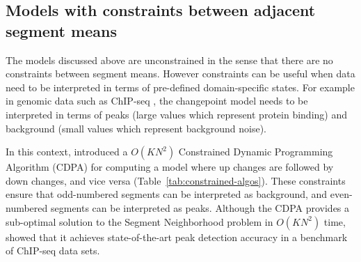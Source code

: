 \documentclass[article]{jss}
\begin{document}

\subsection{Models with constraints between adjacent segment means}


The models discussed above are unconstrained in the sense that there
are no constraints between segment means. However constraints can be
useful when data need to be interpreted in terms of pre-defined
domain-specific states. For example in genomic data such as ChIP-seq
\citep{chip-seq}, the changepoint model needs to be interpreted in
terms of peaks (large values which represent protein binding) and
background (small values which represent background noise).

In this context, \citet{HOCKING-PeakSeg} introduced a $O(KN^2)$
Constrained Dynamic Programming Algorithm (CDPA) for computing a model
where up changes are followed by down changes, and vice versa
(Table~\ref{tab:constrained-algos}). These constraints ensure that
odd-numbered segments can be interpreted as background, and
even-numbered segments can be interpreted as peaks. Although the CDPA
provides a sub-optimal solution to the Segment Neighborhood problem in
$O(KN^2)$ time, \citet{HOCKING2016-chipseq} showed that it achieves
state-of-the-art peak detection accuracy in a benchmark of
ChIP-seq data sets. 

\end{document}
